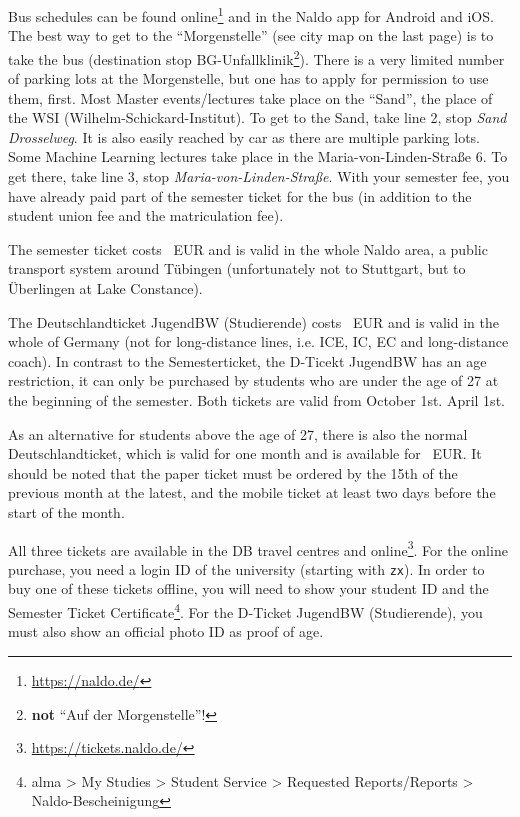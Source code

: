 \ifml
    Bus schedules can be found online\footnote{\url{https://naldo.de/}} and in the Naldo app for Android and iOS.\\
    The best way to get to the "`Morgenstelle"' (see city map on the last page) is to take the bus (destination stop BG-Unfallklinik\footnote{\textbf{not} "`Auf der Morgenstelle"'!}). There is a very limited number of parking lots at the Morgenstelle, but one has to apply for permission to use them, first.
    Most Master events/lectures take place on the "`Sand"', the place of the WSI (Wilhelm-Schickard-Institut). To get to the Sand, take line 2, stop \emph{Sand Drosselweg}. It is also easily reached by car as there are multiple parking lots.
    Some Machine Learning lectures take place in the Maria-von-Linden-Straße 6. To get there, take line 3, stop \emph{Maria-von-Linden-Straße}.
    With your semester fee, you have already paid part of the semester ticket for the bus (in addition to the student union fee and the matriculation fee).
    
    The semester ticket costs \semesterticketpreis~EUR and is valid in the whole Naldo area, a public transport system around
    Tübingen (unfortunately not to Stuttgart, but to Überlingen at Lake Constance).
    
    The Deutschlandticket JugendBW (Studierende) costs \jugendticketbwpreis~EUR and is valid in the whole of Germany (not for long-distance lines, i.e. ICE, IC, EC and long-distance coach).
    In contrast to the Semesterticket, the D-Ticekt JugendBW has an age restriction, it can only be purchased by students who are under the age of 27 at the beginning of the semester.
    Both tickets are valid from
    \ifwintersemester
    October 1st.
    \fi
    \ifsommersemester
    April 1st.
    \fi

    As an alternative for students above the age of 27, there is also the normal Deutschlandticket, which is valid for one month and is available for \detickettuepreis~EUR. 
    It should be noted that the paper ticket must be ordered by the 15th of the previous month at the latest, and the mobile ticket at least two days before the start of the month.

    All three tickets are available in the DB travel centres and online\footnote{\url{https://tickets.naldo.de/}}. For the online purchase, you need a login ID of the university (starting with \texttt{zx}).
    In order to buy one of these tickets offline, you will need to show your student ID and the Semester Ticket Certificate\footnote{alma > My Studies > Student Service > Requested Reports/Reports > Naldo-Bescheinigung}. For the D-Ticket JugendBW (Studierende), you must also show an official photo ID as proof of age.\\
    
